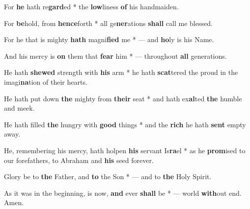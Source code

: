 \begin{multicols}{2}
	For \textbf{he} hath re\textbf{gard}ed * the \textbf{low}liness \textbf{of} his handmaiden.
	
	For \textbf{be}hold, from \textbf{hence}forth * all ge\textbf{ner}ations \textbf{shall} call me blessed.
	
	For he that is mighty \textbf{hath} magni\textbf{fied} me * --- and \textbf{ho}ly is his Name.
	
	And his mercy is \textbf{on} them that \textbf{fear} him * --- throughout \textbf{all} generations.
	
	He hath \textbf{shewed} strength with \textbf{his} arm * he hath \textbf{scat}tered the proud in the imagi\textbf{na}tion of their hearts.
	
	He hath put down \textbf{the} mighty from \textbf{their} seat * and hath ex\textbf{al}ted \textbf{the} humble and meek.
	
	He hath filled \textbf{the} hungry with \textbf{good} things * and the \textbf{rich} he hath \textbf{sent} empty away.
	
	He, remembering his mercy, hath holpen \textbf{his} servant Is\textbf{ra}el * as he \textbf{prom}ised to our forefathers, to Abraham and \textbf{his} seed forever.
	
	Glory be to \textbf{the} Father, and \textbf{to} the Son * --- and to \textbf{the} Holy Spirit.
	
	As it was in the beginning, is now, \textbf{and} ever \textbf{shall} be * --- world \textbf{with}out end. Amen.
\end{multicols}